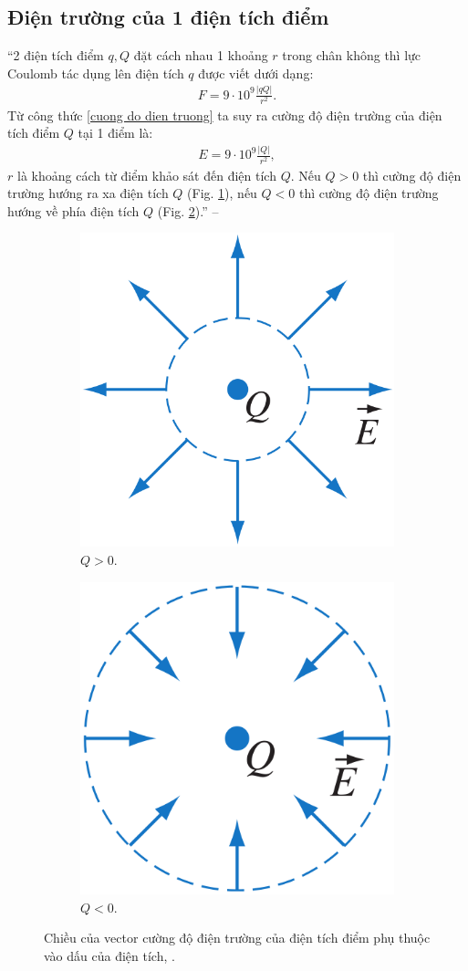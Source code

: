 \documentclass[oneside]{book}
\numberwithin{equation}{section}
\begin{document}
\subsection{Điện trường của 1 điện tích điểm}
``2 điện tích điểm $q,Q$ đặt cách nhau 1 khoảng $r$ trong chân không thì lực Coulomb tác dụng lên điện tích $q$ được viết dưới dạng:
\begin{align*}
	F = 9\cdot 10^9\frac{|qQ|}{r^2}.
\end{align*}
Từ công thức \eqref{cuong do dien truong} ta suy ra cường độ điện trường của điện tích điểm $Q$ tại 1 điểm là:
\begin{align}
	\label{cuong do dien truong 2}
	E = 9\cdot 10^9\frac{|Q|}{r^2},
\end{align}
$r$ là khoảng cách từ điểm khảo sát đến điện tích $Q$. Nếu $Q > 0$ thì cường độ điện trường hướng ra xa điện tích $Q$ (Fig. \ref{fig:chieu_cua_vector_cuong_do_dien_truong_cua_dien_tich_diem_duong}), nếu $Q < 0$ thì cường độ điện trường hướng về phía điện tích $Q$ (Fig. \ref{fig:chieu_cua_vector_cuong_do_dien_truong_cua_dien_tich_diem_am}).'' -- \cite[pp. 16--17]{SGK_Vat_Ly_11_nang_cao}
	
\begin{figure}[H]
	\centering
	\begin{subfigure}{.5\textwidth}
		\centering
		\includegraphics[width=.35\linewidth]{chieu_cua_vector_cuong_do_dien_truong_cua_dien_tich_diem_duong}
		\caption{$Q > 0$.}
		\label{fig:chieu_cua_vector_cuong_do_dien_truong_cua_dien_tich_diem_duong}
	\end{subfigure}%
	\begin{subfigure}{.5\textwidth}
		\centering
		\includegraphics[width=.35\linewidth]{chieu_cua_vector_cuong_do_dien_truong_cua_dien_tich_diem_am}
		\caption{$Q < 0$.}
		\label{fig:chieu_cua_vector_cuong_do_dien_truong_cua_dien_tich_diem_am}
	\end{subfigure}
	\caption{Chiều của vector cường độ điện trường của điện tích điểm phụ thuộc vào dấu của điện tích, \cite[Hình 3.9, p. 17]{SGK_Vat_Ly_11_nang_cao}.}
	\label{fig:chieu_cua_vector_cuong_do_dien_truong_cua_dien_tich_diem}
\end{figure}
\end{document}
